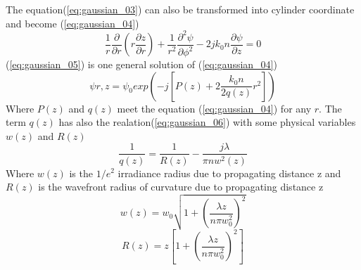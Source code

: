 The equation(\ref{eq:gaussian_03}) can also be transformed into cylinder coordinate and become (\ref{eq:gaussian_04})
\begin{equation}
\frac{1}{r}\frac{\partial}{\partial r}\left(r\frac{\partial z}{\partial r}\right)+\frac{1}{r^2}\frac{ \partial ^{2}\psi}{\partial \phi^2}-2jk_{0}n\frac{\partial\psi}{\partial z}=0
\label{eq:gaussian_04}
\end{equation}
(\ref{eq:gaussian_05}) is one general solution of (\ref{eq:gaussian_04})
\begin{equation}
\psi{r,z}=\psi_{0}exp\left(-j\left[P(z)+2 \frac{ k_{0}n}{2q(z)}r^2\right]\right)
\label{eq:gaussian_05}
\end{equation}
Where $P(z)$ and $q(z)$ meet the equation (\ref{eq:gaussian_04}) for any $r$. The term $q(z)$ has also the realation(\ref{eq:gaussian_06}) with some physical variables $w(z)$ and $R(z)$
\begin{equation}
\frac{1}{q(z)}=\frac{1}{R(z)}-\frac{j\lambda}{\pi nw^{2}(z)}
\label{eq:gaussian_06}
\end{equation}
Where $w(z)$ is the $1/e^2$ irradiance radius due to propagating distance z and $R(z)$ is the wavefront radius of curvature due to propagating distance z
\begin{equation}
w(z)=w_{0}\sqrt{1+(\frac{\lambda z}{n\pi w^{2}_{0}})^{2}}
\label{eq:gaussian_07}
\end{equation}
\begin{equation}
R(z)=z\left[1+(\frac{\lambda z}{n\pi w^{2}_{0}})^{2}\right]
\label{eq:gaussian_08}
\end{equation}

